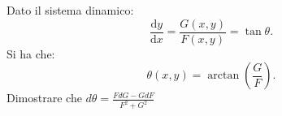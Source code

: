 \begin{ex}[]
    Dato il sistema dinamico:
    \[
	\frac{\text{d} y}{\text{d} x} = \frac{G(x, y)}{F(x, y)} = \tan\theta
    .\] 
    Si ha che:
    \[
	\theta (x, y) = \arctan (\frac{G}{F}) 
    .\] 
    Dimostrare che $d\theta  = \frac{FdG-GdF}{F^2+G^2}$  
\end{ex}
\noindent
